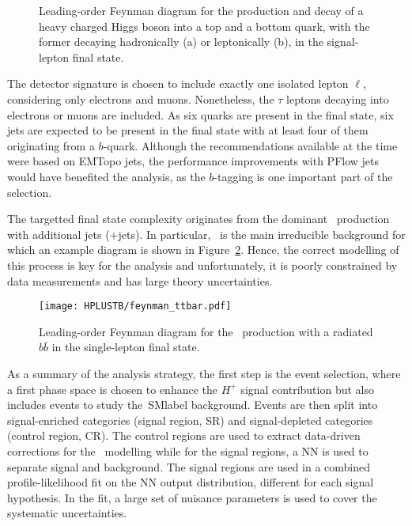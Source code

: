 \begin{figure}[htbp]
    \RawFloats
    \begin{center}
     \quad
    \caption{
        Leading-order Feynman diagram for the production and decay of a heavy charged Higgs boson into a top and a bottom quark, with the former decaying hadronically (a) or leptonically (b), in the signal-lepton final state.
    }
    \label{Hplustb:feynman2}
    \end{center}
\end{figure}

The detector signature is chosen to include exactly one isolated lepton $\ell$, considering only electrons and muons. Nonetheless, the $\tau$ leptons decaying into electrons or muons are included. As six quarks are present in the final state, six jets are expected to be present in the final state with at least four of them originating from a $b$-quark. Although the recommendations available at the time were based on EMTopo jets, the performance improvements with PFlow jets would have benefited the analysis, as the $b$-tagging is one important part of the selection.

The targetted final state complexity originates from the dominant \ttbar\ production with additional jets (\ttbar+jets). In particular, \ttb\ is the main irreducible background for which an example diagram is shown in Figure~\ref{Hplustb:feynman3}. Hence, the correct modelling of this process is key for the analysis and unfortunately, it is poorly constrained by data measurements and has large theory uncertainties. 


\begin{figure}[htbp]
    \RawFloats
    \begin{center}
    \texttt{[image: HPLUSTB/feynman\_ttbar.pdf]}
    \caption{
        Leading-order Feynman diagram for the \ttbar\ production with a radiated $b\bar{b}$ in the single-lepton final state.
    }
    \label{Hplustb:feynman3}
    \end{center}
\end{figure}

As a summary of the analysis strategy, the first step is the event selection, where a first phase space is chosen to enhance the $H^+$ signal contribution but also includes events to study the~\acrshort{SMlabel} background. Events are then split into signal-enriched categories (signal region, SR) and signal-depleted categories (control region, CR). The control regions are used to extract data-driven corrections for the \ttbar\ modelling while for the signal regions, a NN is used to separate signal and background. The signal regions are used in a combined profile-likelihood fit on the NN output distribution, different for each signal hypothesis. In the fit, a large set of nuisance parameters is used to cover the systematic uncertainties.

